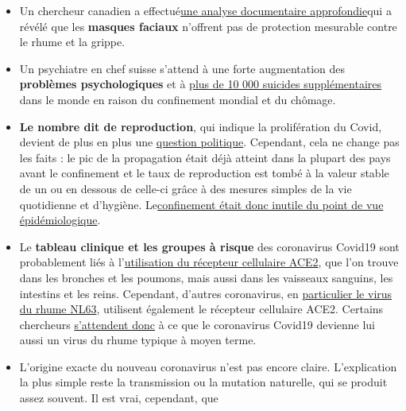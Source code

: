 \begin{itemize}
\tightlist
\item
  Un chercheur canadien a
  effectué\href{https://www.researchgate.net/publication/340570735_Masks_Don't_Work_A_review_of_science_relevant_to_COVID-19_social_policy}{une
  analyse documentaire approfondie}qui a révélé que les \textbf{masques
  faciaux} n'offrent pas de protection mesurable contre le rhume et la
  grippe.
\item
  Un psychiatre en chef suisse s'attend à une forte augmentation des
  \textbf{problèmes psychologiques} et à
  \href{https://www.aargauerzeitung.ch/aargau/kanton-aargau/aargauer-psychiatrie-chefarzt-kawohl-warnt-arbeitslosigkeit-erhoeht-das-suizidrisiko-137742663}{plus
  de 10 000 suicides supplémentaires} dans le monde en raison du
  confinement mondial et du chômage.
\item
  \textbf{Le nombre dit de reproduction}, qui indique la prolifération
  du Covid, devient de plus en plus une
  \href{https://www.tagesschau.de/faktenfinder/corona-reproduktionszahl-101.html}{question
  politique}. Cependant, cela ne change pas les faits : le pic de la
  propagation était déjà atteint dans la plupart des pays avant le
  confinement et le taux de reproduction est tombé à la valeur stable de
  un ou en dessous de celle-ci grâce à des mesures simples de la vie
  quotidienne et d'hygiène.
  Le\href{https://infekt.ch/2020/04/sind-wir-tatsaechlich-im-blindflug/}{confinement
  était donc inutile du point de vue épidémiologique}.
\item
  Le \textbf{tableau clinique et les groupes à risque} des coronavirus
  Covid19 sont probablement liés à
  l'\href{https://www.news-medical.net/news/20200420/ACE2-TMPRSS2-profiling-indicates-tissue-vulnerability-to-SARS-CoV-2-infection.aspx}{utilisation
  du récepteur cellulaire ACE2}, que l'on trouve dans les bronches et
  les poumons, mais aussi dans les vaisseaux sanguins, les intestins et
  les reins. Cependant, d'autres coronavirus, en
  \href{https://www.ncbi.nlm.nih.gov/pmc/articles/PMC4369385/}{particulier
  le virus du rhume NL63}, utilisent également le récepteur cellulaire
  ACE2. Certains chercheurs
  \href{https://www.ncbi.nlm.nih.gov/pmc/articles/PMC7074995/}{s'attendent
  donc} à ce que le coronavirus Covid19 devienne lui aussi un virus du
  rhume typique à moyen terme.
\item
  L'origine exacte du nouveau coronavirus n'est pas encore claire.
  L'explication la plus simple reste la transmission ou la mutation
  naturelle, qui se produit assez souvent. Il est vrai, cependant, que

\end{itemize}
